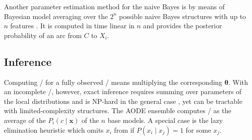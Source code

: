 Another parameter estimation method for the naive Bayes is by means of
Bayesian model averaging over the \(2^n\) possible naive Bayes
structures with up to \(n\) features \citep{Dash2002}. It is computed in
time linear in \(n\) and provides the posterior probability of an arc
from \(C\) to \(X_i\).

\subsection{Inference}\label{inference}

Computing \pcgx/ for a fully observed \x/ means multiplying the
corresponding \(\boldsymbol{\theta}\). With an incomplete \x/, however,
exact inference requires summing over parameters of the local
distributions and is NP-hard in the general case \citep{cooper1990}, yet
can be tractable with limited-complexity structures. The AODE ensemble
computes \pcgx/ as the average of the \(P_i (c\mid\mathbf{x})\) of the
\(n\) base models. A special case is the lazy elimination
\citep{zheng2006efficient} heuristic which omits \(x_i\) from
 if \(P(x_i \mid x_j) = 1\) for some \(x_j\).
